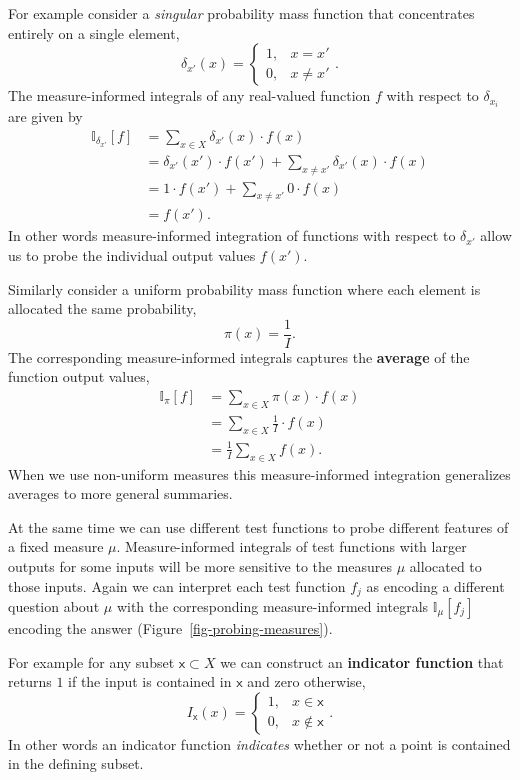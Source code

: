 \documentclass[
  letterpaper,
  DIV=11,
  numbers=noendperiod]{scrartcl}
\begin{document}
For example consider a \emph{singular} probability mass function that
concentrates entirely on a single element, \[
\delta_{x'} (x) =
\left\{
\begin{array}{rr}
1, & x = x' \\
0, & x \neq x'
\end{array}
\right. .
\] The measure-informed integrals of any real-valued function \(f\) with
respect to \(\delta_{x_{i}}\) are given by \begin{align*}
\mathbb{I}_{\delta_{x'}}[f]
&= \sum_{x \in X} \delta_{x'}(x) \cdot f(x)
\\
&= \delta_{x'}(x') \cdot f(x')
  + \sum_{x \neq x'} \delta_{x'}(x) \cdot f(x)
\\
&=  1 \cdot f(x')
  + \sum_{x \neq x'} 0 \cdot f(x)
\\
&= f(x').
\end{align*} In other words measure-informed integration of functions
with respect to \(\delta_{x'}\) allow us to probe the individual output
values \(f(x')\).

Similarly consider a uniform probability mass function where each
element is allocated the same probability, \[
\pi(x) = \frac{1}{I}.
\] The corresponding measure-informed integrals captures the
\textbf{average} of the function output values, \begin{align*}
\mathbb{I}_{\pi}[f]
&= \sum_{x \in X} \pi(x) \cdot f(x)
\\
&= \sum_{x \in X} \frac{1}{I} \cdot f(x)
\\
&= \frac{1}{I} \sum_{x \in X} f(x).
\end{align*} When we use non-uniform measures this measure-informed
integration generalizes averages to more general summaries.

At the same time we can use different test functions to probe different
features of a fixed measure \(\mu\). Measure-informed integrals of test
functions with larger outputs for some inputs will be more sensitive to
the measures \(\mu\) allocated to those inputs. Again we can interpret
each test function \(f_{j}\) as encoding a different question about
\(\mu\) with the corresponding measure-informed integrals
\(\mathbb{I}_{\mu}[f_{j}]\) encoding the answer
(Figure~\ref{fig-probing-measures}).

For example for any subset \(\mathsf{x} \subset X\) we can construct an
\textbf{indicator function} that returns \(1\) if the input is contained
in \(\mathsf{x}\) and zero otherwise, \[
I_{\mathsf{x}} (x) =
\left\{
\begin{array}{rr}
1, & x \in \mathsf{x} \\
0, & x \notin \mathsf{x}
\end{array}
\right. .
\] In other words an indicator function \emph{indicates} whether or not
a point is contained in the defining subset.
\end{document}
